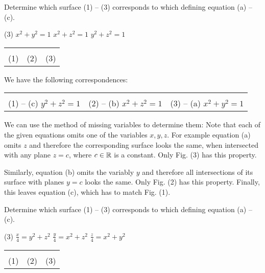 \begin{question}
Determine which surface (1) -- (3) corresponds to which defining equation (a) -- (c).
\begin{tasks}(3)
\task
$x^2 + y^2 = 1$
\task
$x^2 + z^2 = 1$
\task
$y^2 + z^2 = 1$
\end{tasks}

\begin{center}
\begin{tabu} to \linewidth {X[1,c] X[1,c] X[1,c]}
 &
 &
 \\
(1) & 
(2) & 
(3)
\end{tabu}
\end{center}
\end{question}

\begin{solution}
We have the following correspondences:

\begin{center}
\begin{tabu} to \linewidth {X[1,c] X[1,c] X[1,c]}
 &
 &
 \\
(1) -- (c) $y^2 + z^2 = 1$ & 
(2) -- (b) $x^2 + z^2 = 1$ & 
(3) -- (a) $x^2 + y^2 = 1$
\end{tabu}
\end{center}

We can use the method of missing variables to determine them: Note that each of the given equations omits one of the variables $x, y, z$. For example equation (a) omits $z$ and therefore the corresponding surface looks the same, when intersected with any plane $z=c$, where $c \in {\mathbb R}$ is a constant. Only Fig. (3) has this property. 

Similarly, equation (b) omits the variably $y$ and therefore all intersections of its surface with planes $y=c$ looks the same. Only Fig. (2) has this property. Finally, this leaves equation (c), which has to match Fig. (1).
\end{solution}

\begin{question}
Determine which surface (1) -- (3) corresponds to which defining equation (a) -- (c).
\begin{tasks}(3)
\task
$\frac x 4 = y^2 + z^2$
\task
$\frac y 4 = x^2 + z^2$
\task
$\frac z 4 = x^2 + y^2$
\end{tasks}

\begin{center}
\begin{tabu} to \linewidth {X[1,c] X[1,c] X[1,c]}
 &
 &
 \\
(1) & 
(2) & 
(3)
\end{tabu}
\end{center}
\end{question}

